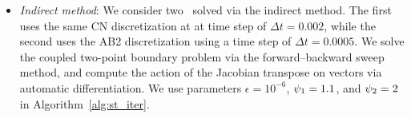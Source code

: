 \begin{itemize}
\begin{itemize}
\item \textit{Indirect method}: We consider two \methodAcronymROMs\ solved via the indirect method. The first uses the same CN discretization at at time step of $\Delta t = 0.002$, while the second uses the AB2 discretization using a time step of $\Delta t = 0.0005$. We solve the coupled two-point boundary 
problem via the forward--backward sweep method, and compute the action of the Jacobian transpose on vectors via automatic differentiation. We use parameters $\epsilon = 10^{-6}$, $\psi_1 = 1.1$, and $\psi_2=2$ in Algorithm~\ref{alg:st_iter}. 
\end{itemize}
\end{itemize}

%




